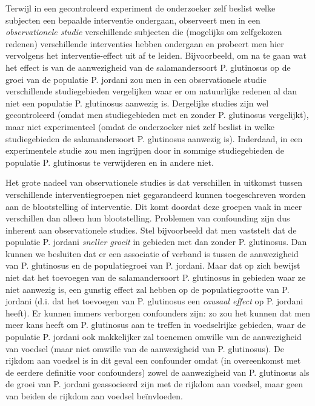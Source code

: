 \documentclass[
  12pt,dutch,coursenotes]{book}
\theoremstyle{definition}
\theoremstyle{definition}
\theoremstyle{definition}
\theoremstyle{definition}
\theoremstyle{remark}
\begin{document}
Terwijl in een gecontroleerd experiment de onderzoeker zelf beslist
welke subjecten een bepaalde interventie ondergaan, observeert men
in een \emph{observationele studie} verschillende subjecten die (mogelijks om zelfgekozen redenen) verschillende interventies hebben ondergaan en probeert men hier vervolgens het interventie-effect uit af te leiden. Bijvoorbeeld, om na te gaan wat het effect is van de aanwezigheid van de salamandersoort P. glutinosus op de groei van de populatie P. jordani zou men in een observationele studie verschillende studiegebieden vergelijken waar er om natuurlijke redenen al dan niet een populatie P. glutinosus aanwezig is. Dergelijke studies
zijn wel gecontroleerd (omdat men studiegebieden met en zonder P. glutinosus vergelijkt), maar niet experimenteel (omdat de
onderzoeker niet zelf beslist in welke studiegebieden de salamandersoort P. glutinosus aanwezig is). Inderdaad, in een experimentele studie zou men ingrijpen door in sommige studiegebieden de populatie P. glutinosus te verwijderen en in andere niet.

Het grote nadeel van observationele studies is dat verschillen in uitkomst
tussen verschillende interventiegroepen niet gegarandeerd kunnen
toegeschreven worden aan de blootstelling of interventie. Dit komt doordat deze groepen
vaak in meer verschillen dan alleen hun blootstelling. Problemen van
confounding zijn dus inherent aan observationele studies. Stel bijvoorbeeld
dat men vaststelt dat de populatie P. jordani \emph{sneller groeit} in gebieden met
dan zonder P. glutinosus. Dan kunnen we besluiten dat
er een associatie of verband is tussen de aanwezigheid van P. glutinosus en de populatiegroei van P. jordani. Maar dat op zich
bewijst niet dat het toevoegen van de salamandersoort P. glutinosus in gebieden waar ze niet aanwezig is, een gunstig effect zal hebben op de populatiegrootte van P. jordani (d.i. dat het toevoegen van P. glutinosus een \emph{causaal effect} op P. jordani heeft). Er kunnen immers verborgen confounders zijn: zo zou het kunnen dat men meer kans heeft om P. glutinosus aan te treffen in voedselrijke gebieden, waar de populatie P. jordani ook makkelijker zal toenemen omwille van de aanwezigheid van voedsel (maar niet omwille van de aanwezigheid van P. glutinosus).
De rijkdom aan voedsel is in dit geval
een confounder omdat (in overeenkomst met de eerdere definitie voor
confounders) zowel de aanwezigheid van P. glutinosus als de groei van P. jordani
geassocieerd zijn met de rijkdom aan voedsel, maar geen van beiden de rijkdom aan voedsel beïnvloeden.
\end{document}
